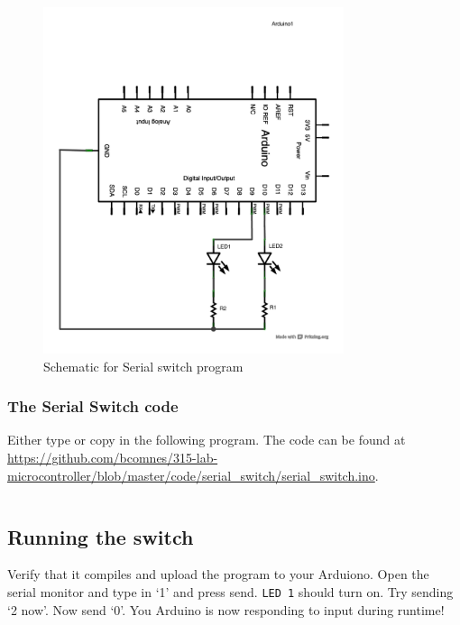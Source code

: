 \documentclass[11pt,a4paper]{article}
\begin{document}
\begin{figure}[htbp]
    \centering
        \includegraphics[height=4in]{figures/serial_switch_schem.pdf}
    \caption{Schematic for Serial switch program}
    \label{fig:figures_serial_switch_schem}
\end{figure}

\subsubsection{The Serial Switch code} %
\label{ssub:the_serial_switch_code}

Either type or copy in the following program.  The code can be found at \url{https://github.com/bcomnes/315-lab-microcontroller/blob/master/code/serial_switch/serial_switch.ino}.

\inputminted[mathescape,linenos,numbersep=5pt,gobble=0,frame=lines,framesep=2mm]{c}{code/serial_switch/serial_switch.ino}


\subsection{Running the switch} %
\label{sub:running_the_switch}

Verify that it compiles and upload the program to your Arduiono.  Open the serial monitor and type in `1' and press send.  \texttt{LED 1} should turn on.  Try sending `2 now'.  Now send `0'.  You Arduino is now responding to input during runtime!


 
 \nocite{*}
\end{document}
